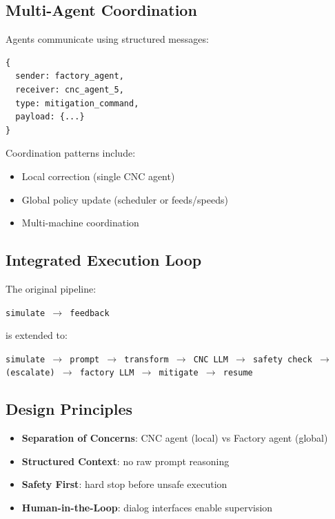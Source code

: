 \documentclass{article}
\begin{document}
\subsection{Multi-Agent Coordination}

Agents communicate using structured messages:

\begin{verbatim}
{
  sender: factory_agent,
  receiver: cnc_agent_5,
  type: mitigation_command,
  payload: {...}
}
\end{verbatim}

Coordination patterns include:
\begin{itemize}
    \item Local correction (single CNC agent)
    \item Global policy update (scheduler or feeds/speeds)
    \item Multi-machine coordination
\end{itemize}

\subsection{Integrated Execution Loop}

The original pipeline:
\begin{center}
\texttt{simulate $\rightarrow$ feedback}
\end{center}

is extended to:
\begin{center}
\texttt{simulate $\rightarrow$ prompt $\rightarrow$ transform $\rightarrow$ CNC LLM $\rightarrow$ safety check $\rightarrow$ (escalate) $\rightarrow$ factory LLM $\rightarrow$ mitigate $\rightarrow$ resume}
\end{center}

\subsection{Design Principles}

\begin{itemize}
    \item \textbf{Separation of Concerns}: CNC agent (local) vs Factory agent (global)
    \item \textbf{Structured Context}: no raw prompt reasoning
    \item \textbf{Safety First}: hard stop before unsafe execution
    \item \textbf{Human-in-the-Loop}: dialog interfaces enable supervision
\end{itemize}
\end{document}
